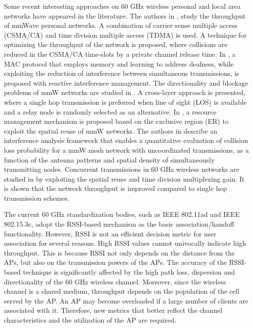 \documentclass[journal, 10pt, twocolumn]{IEEEtran}
\begin{document}
Some recent interesting approaches on 60 GHz wireless personal and local area networks have appeared in the literature. The authors in \cite{Pyo09}, study the throughput of mmWave personal networks. A combination of carrier sense multiple access (CSMA/CA) and time division multiple access (TDMA) is used. A technique for optimizing the throughput of the network is proposed, where collisions are reduced in the CSMA/CA time-slots by a private channel release time. In \cite{Singh10}, a MAC protocol that employs memory and learning to address deafness, while exploiting the reduction of interference between simultaneous transmissions, is proposed with reactive interference management. The directionality and blockage problems of mmW networks are studied in \cite{Singh07}. A cross-layer approach is presented, where a single hop transmission is preferred when line of sight (LOS) is available and a relay node is randomly selected as an alternative. In \cite{Cai10}, a resource management mechanism is proposed based on the exclusive region (ER) to exploit the spatial reuse of mmW networks. The authors in \cite{Singh11} describe an interference analysis framework that enables a quantitative evaluation of collision loss probability for a mmW mesh network with uncoordinated transmissions, as a function of the antenna patterns and spatial density of simultaneously transmitting nodes. Concurrent transmissions in 60 GHz wireless networks are studied in \cite{Qiao11} by exploiting the spatial reuse and time division multiplexing gain. It is shown that the network throughput is improved compared to single hop transmission schemes.

The current 60 GHz standardization bodies, such as IEEE 802.11ad and IEEE 802.15.3c, adopt the RSSI-based mechanism as the basic association/handoff functionality. However, RSSI is not an efficient decision metric for user association for several reasons. High RSSI values cannot univocally indicate high throughput. This is because RSSI not only depends on the distance from the APs, but also on the transmission powers of the APs. The accuracy of the RSSI-based technique is significantly affected by the high path loss, dispersion and directionality of the 60 GHz wireless channel. Moreover, since the wireless channel is a shared medium, throughput depends on the population of the cell served by the AP. An AP may become overloaded if a large number of clients are associated with it. Therefore, new metrics that better reflect the channel characteristics and the utilization of the AP are required.
\end{document}
